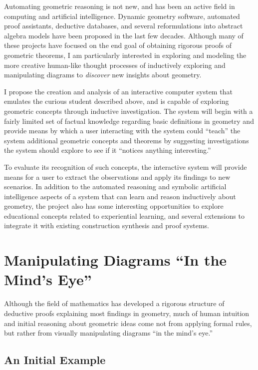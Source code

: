 \documentclass[10pt]{article}
\begin{document}
\newpage
Automating geometric reasoning is not new, and has been an active
field in computing and artificial intelligence.  Dynamic geometry
software, automated proof assistants, deductive databases, and several
reformulations into abstract algebra models have been proposed in the
last few decades.  Although many of these projects have focused on the
end goal of obtaining rigorous proofs of geometric theorems, I am
particularly interested in exploring and modeling the more creative
human-like thought processes of inductively exploring and manipulating
diagrams to \emph{discover} new insights about geometry.

I propose the creation and analysis of an interactive computer system
that emulates the curious student described above, and is capable of
exploring geometric concepts through inductive investigation.  The
system will begin with a fairly limited set of factual knowledge
regarding basic definitions in geometry and provide means by which a
user interacting with the system could ``teach'' the system additional
geometric concepts and theorems by suggesting investigations the
system should explore to see if it ``notices anything interesting.''

To evaluate its recognition of such concepts, the interactive system
will provide means for a user to extract the observations and apply
its findings to new scenarios.  In addition to the automated reasoning
and symbolic artificial intelligence aspects of a system that can
learn and reason inductively about geometry, the project also has some
interesting opportunities to explore educational concepts related to
experiential learning, and several extensions to integrate it with
existing construction synthesis and proof systems.

\section{Manipulating  Diagrams ``In the Mind's Eye''}

Although the field of mathematics has developed a rigorous structure
of deductive proofs explaining most findings in geometry, much of
human intuition and initial reasoning about geometric ideas come not
from applying formal rules, but rather from visually manipulating
diagrams ``in the mind's eye.''

\singlespacing
\subsection{An Initial Example}
\end{document}
